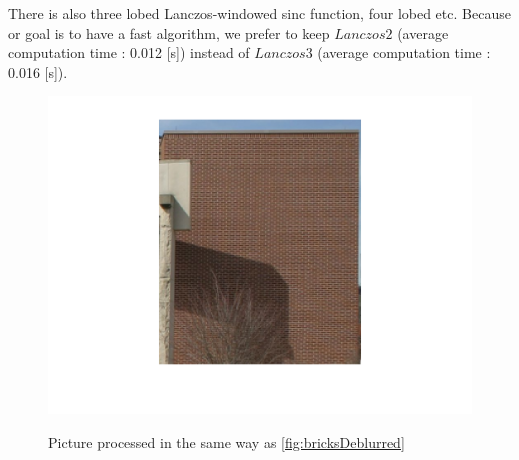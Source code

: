 There is also three lobed Lanczos-windowed sinc function, four lobed etc. Because or goal is to have a fast algorithm, we prefer to keep $Lanczos2$ (average computation time :  0.012 [s]) instead of $Lanczos3$ (average computation time : 0.016 [s]).

\begin{figure}
\centering
\includegraphics[scale=•]{../Images/bricksLanczos.png}
\label{fig:bricksLanczos}
\caption{Picture processed in the same way as \ref{fig:bricksDeblurred} }
\end{figure}
%



 